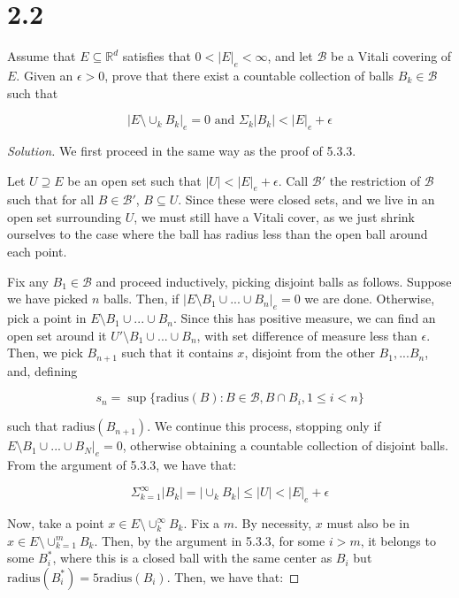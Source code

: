 \documentclass[10pt]{article}
\newenvironment{problem}[2][Problem]{\begin{trivlist}
\item[\hskip \labelsep {\bfseries #1}\hskip \labelsep {\bfseries #2.}]}{\end{trivlist}}
\begin{document}
\section*{2.2}


\begin{problem}{5.3.5}
Assume that $E \subseteq \mathbb{R}^d$ satisfies that $0 < |E|_e < \infty$, and let $\mathcal{B}$ be a Vitali covering of $E$. Given an $\epsilon > 0$, prove that there exist a countable collection of balls $B_k \in \mathcal{B}$ such that

$$\left| E \setminus \cup_k B_k \right|_e = 0 \text{ and } \Sigma_k |B_k| < |E|_e + \epsilon $$

\end{problem}
\begin{proof}[Solution]

We first proceed in the same way as the proof of 5.3.3.

Let $U \supseteq E$ be an open set such that $|U| < |E|_e + \epsilon$. Call $\mathcal{B}'$ the restriction of $\mathcal{B}$ such that for all $B \in \mathcal{B}'$, $B \subseteq U$. Since these were closed sets, and we live in an open set surrounding $U$, we must still have a Vitali cover, as we just shrink ourselves to the case where the ball has radius less than the open ball around each point.

Fix any $B_1 \in \mathcal{B}$ and proceed inductively, picking disjoint balls as follows. Suppose we have picked $n$ balls. Then, if $|E \setminus B_1 \cup ... \cup B_n|_e = 0$ we are done. Otherwise, pick a point in $E \setminus B_1 \cup ... \cup B_n$. Since this has positive measure, we can find an open set around it $U' \setminus B_1 \cup ... \cup B_n$, with set difference of measure less than $\epsilon$. Then, we pick $B_{n+1}$ such that it contains $x$, disjoint from the other $B_1,...B_n$, and, defining

$$s_n = \sup\{ \text{radius}(B) : B \in \mathcal{B}, B \cap B_i, 1 \leq i < n \}$$

such that $\text{radius}(B_{n+1})$. We continue this process, stopping only if $E \setminus B_1 \cup ... \cup B_N|_e = 0$, otherwise obtaining a countable collection of disjoint balls. From the argument of 5.3.3, we have that:

$$ \Sigma_{k=1}^\infty |B_k| = | \cup_k B_k | \leq |U| < |E|_e + \epsilon $$

Now, take a point $x \in E \setminus \cup_k^\infty B_k$. Fix a $m$. By necessity, $x$ must also be in $x \in E \setminus \cup_{k=1}^m B_k$. Then, by the argument in 5.3.3, for some $i > m$, it belongs to some $B_i^*$, where this is a closed ball with the same center as $B_i$ but $\text{radius}(B_i^*)  = 5 \text{radius}(B_i)$. Then, we have that:


\end{proof}
\end{document}
